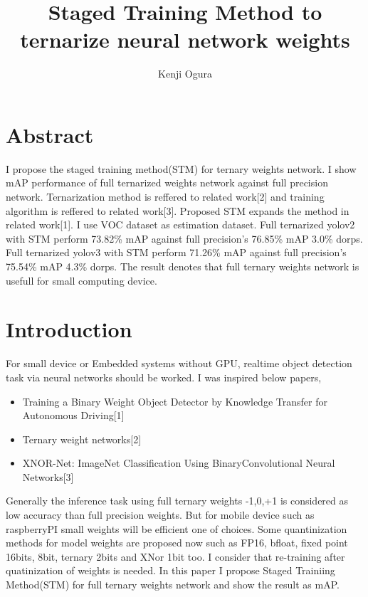 \documentclass[twocolumn]{article}
\begin{document}
\title{Staged Training Method to ternarize neural network weights}
\author{Kenji Ogura}
\date{}
\maketitle

\section{Abstract}
I propose the staged training method(STM) for ternary weights network.
I show mAP performance of full ternarized weights network against full precision network.
Ternarization method is reffered to related work[2] and training algorithm is reffered to related work[3].
Proposed STM expands the method in related work[1].
I use VOC dataset as estimation dataset.
Full ternarized yolov2 with STM perform 73.82\% mAP against full precision's 76.85\% mAP  3.0\% dorps.
Full ternarized yolov3 with STM perform 71.26\% mAP against full precision's 75.54\% mAP 4.3\% dorps.
The result denotes that full ternary weights network is usefull for small computing device.

\section{Introduction}

For small device or Embedded systems without GPU, realtime object detection task via neural networks should be worked.
I was inspired below papers,
\begin{itemize}
\item
 Training a Binary Weight Object Detector by Knowledge Transfer for Autonomous Driving[1]
\item
 Ternary weight networks[2]
\item
 XNOR-Net: ImageNet Classification Using BinaryConvolutional Neural Networks[3]
\end{itemize}

Generally the inference task using full ternary weights -1,0,+1 is considered as low accuracy than full precision weights.
But for mobile device such as raspberryPI small weights will be efficient one of choices.
Some quantinization methods for model weights are proposed now such as FP16, bfloat, fixed point 16bits, 8bit, ternary 2bits and XNor 1bit too.
I consider that re-training after quatinization of weights is needed.
In this paper I propose Staged Trainiing Method(STM) for full ternary weights network and show the result as mAP.
\end{document}
